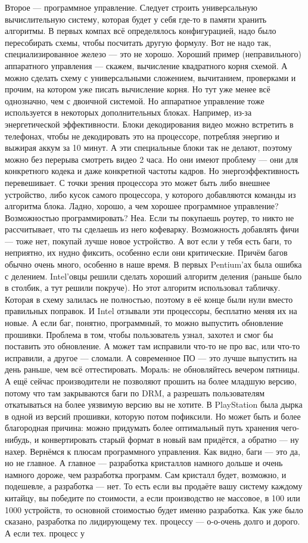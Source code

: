 \documentclass{article}
\begin{document}
    Второе --- программное управление. Следует строить универсальную вычислительную систему, которая будет у себя где-то в памяти хранить алгоритмы. В первых компах всё определялось конфигурацией, надо было пересобирать схемы, чтобы посчитать другую формулу. Вот не надо так, специализированное железо --- это не хорошо. Хороший пример (неправильного) аппаратного управления --- скажем, вычисление квадратного корня схемой. А можно сделать схему с универсальными сложением, вычитанием, проверками и прочим, на котором уже писать вычисление корня. Но тут уже менее всё однозначно, чем с двоичной системой. Но аппаратное управление тоже используется в некоторых дополнительных блоках. Например, из-за энергетической эффективности. Блоки декодирования видео можно встретить в телефонах, чтобы не декодировать это на процессоре, потребляя энергию и выжирая аккум за 10 минут. А эти специальные блоки так не делают, поэтому можно без перерыва смотреть видео 2 часа. Но они имеют проблему --- они для конкретного кодека и даже конкретной частоты кадров. Но энергоэффективность перевешивает. С точки зрения процессора это может быть либо внешнее устройство, либо кусок самого процессора, у которого добавляются команды из алгоритма блока. Ладно, хорошо, а чем хорошее программное управление? Возможностью программировать? Неа. Если ты покупаешь роутер, то никто не рассчитывает, что ты сделаешь из него кофеварку. Возможность добавлять фичи --- тоже нет, покупай лучше новое устройство. А вот если у тебя есть баги, то неприятно, их нудно фиксить, особенно если они критические. Причём багов обычно очень много, особенно в наше время. В первых Pentium'ах была ошибка с делением. Intel'овцы решили сделать хороший алгоритм деления (раньше было в столбик, а тут решили покруче). Но этот алгоритм использовал табличку. Которая в схему залилась не полностью, поэтому в её конце были нули вместо правильных поправок. И Intel отзывали эти процессоры, бесплатно меняя их на новые. А если баг, понятно, программный, то можно выпустить обновление прошивки. Проблема в том, чтобы пользователь узнал, захотел и смог бы поставить это обновление. А может там исправили что-то не про вас, или что-то исправили, а другое --- сломали. А современное ПО --- это лучше выпустить на день раньше, чем всё оттестировать. Мораль: не обновляйтесь вечером пятницы. А ещё сейчас производители не позволяют прошить на более младшую версию, потому что там закрываются баги по DRM, а разрешать пользователям откатываться на более уязвимую версию вы не хотите. В PlayStation была дырка в одной из версий прошивки, которую потом пофиксили. Но может быть и более благородная причина: можно придумать более оптимальный путь хранения чего-нибудь, и конвертировать старый формат в новый вам придётся, а обратно --- ну нахер. Вернёмся к плюсам программного управления. Как видно, баги --- это да, но не главное. А главное --- разработка кристаллов намного дольше и очень намного дороже, чем разработка программ. Сам кристалл будет, возможно, и подешевле, а разработка --- нет. То есть если вы продаёте вашу систему каждому китайцу, вы победите по стоимости, а если производство не массовое, в 100 или 1000 устройств, то основной стоимостью будет именно разработка. Как уже было сказано, разработка по лидирующему тех. процессу --- о-о-очень долго и дорого. А если тех. процесс у 
\end{document}
